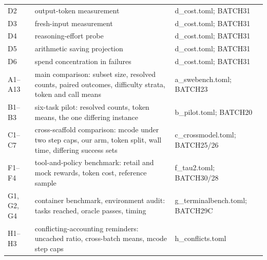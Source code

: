 {{\begin{tabular}{@{}p{1.5cm}p{7.6cm}p{4.4cm}@{}}
D2 & output-token measurement & d\_cost.toml; BATCH31 \\
D3 & fresh-input measurement & d\_cost.toml; BATCH31 \\
D4 & reasoning-effort probe & d\_cost.toml; BATCH31 \\
D5 & arithmetic saving projection & d\_cost.toml; BATCH31 \\
D6 & spend concentration in failures & d\_cost.toml; BATCH31 \\
A1--A13 & main comparison: subset size, resolved counts, paired outcomes, difficulty strata, token and call means & a\_swebench.toml; BATCH23 \\
B1--B3 & six-task pilot: resolved counts, token means, the one differing instance & b\_pilot.toml; BATCH20 \\
C1--C7 & cross-scaffold comparison: mcode under two step caps, our arm, token split, wall time, differing success sets & c\_crossmodel.toml; BATCH25/26 \\
F1--F4 & tool-and-policy benchmark: retail and mock rewards, token cost, reference sample & f\_tau2.toml; BATCH30/28 \\
G1, G2, G4 & container benchmark, environment audit: tasks reached, oracle passes, timing & g\_terminalbench.toml; BATCH29C \\
H1--H3 & conflicting-accounting reminders: uncached ratio, cross-batch means, mcode step caps & h\_conflicts.toml \\
\bottomrule
\end{tabular}
}
}
